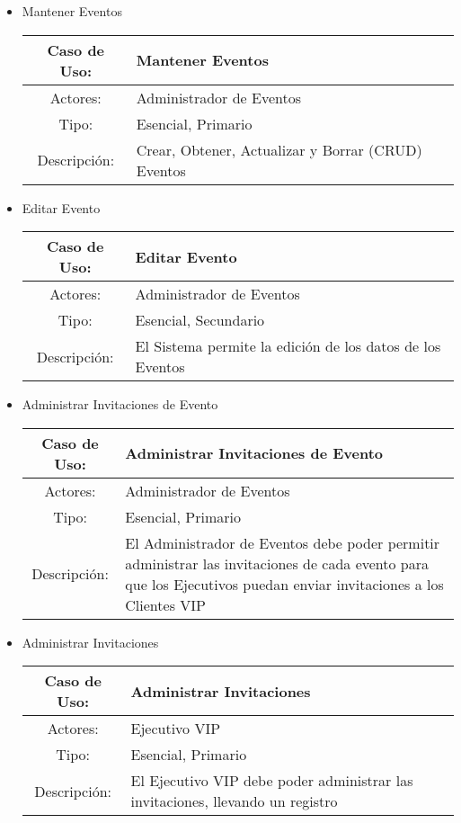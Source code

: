 \begin{itemize}
	\item Mantener Eventos\\
		\begin{tabular}{|c|p{11cm}|}\hline
			Caso de Uso: & Mantener Eventos\\\hline
			Actores: & Administrador de Eventos\\\hline
			Tipo: & Esencial, Primario\\\hline
			Descripción: & Crear, Obtener, Actualizar y Borrar (CRUD) Eventos\\\hline
		\end{tabular}

	\item Editar Evento\\
		\begin{tabular}{|c|p{11cm}|}\hline
			Caso de Uso: & Editar Evento\\\hline
			Actores: & Administrador de Eventos\\\hline
			Tipo: & Esencial, Secundario\\\hline
			Descripción: &El Sistema permite la edición de los datos de los Eventos\\\hline
		\end{tabular}

	\item Administrar Invitaciones de Evento\\
		\begin{tabular}{|c|p{11cm}|}\hline
			Caso de Uso: & Administrar Invitaciones de Evento\\\hline
			Actores: &Administrador de Eventos\\\hline
			Tipo: & Esencial, Primario\\\hline
			Descripción: &El Administrador de Eventos debe poder permitir administrar las invitaciones de cada evento para que los Ejecutivos puedan enviar invitaciones a los Clientes VIP\\\hline
		\end{tabular}

	\item Administrar Invitaciones\\
		\begin{tabular}{|c|p{11cm}|}\hline
			Caso de Uso: & Administrar Invitaciones\\\hline
			Actores: & Ejecutivo VIP\\\hline
			Tipo: & Esencial, Primario\\\hline
			Descripción: &El Ejecutivo VIP debe poder administrar las invitaciones, llevando un registro\\\hline
		\end{tabular}


\end{itemize}
